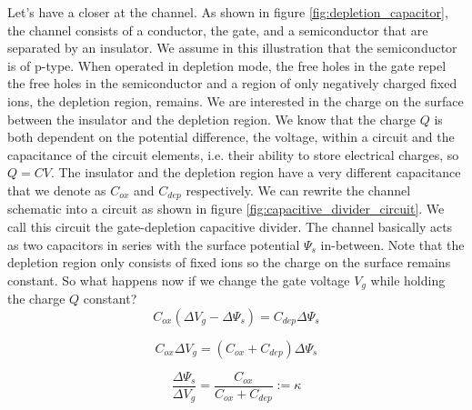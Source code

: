 Let's have a closer at the channel. As shown in figure \ref{fig:depletion_capacitor}, the channel consists of a conductor, the gate, and a semiconductor that are separated by an insulator. We assume in this illustration that the semiconductor is of p-type. When operated in depletion mode, the free holes in the gate repel the free holes in the semiconductor and a region of only negatively charged fixed ions, the depletion region, remains. We are interested in the charge on the surface between the insulator and the depletion region. We know that the charge $Q$ is both dependent on the potential difference, the voltage, within a circuit and the capacitance of the circuit elements, i.e. their ability to store electrical charges, so $Q = CV$. The insulator and the depletion region have a very different capacitance that we denote as $C_{ox}$ and $C_{dep}$ respectively. We can rewrite the channel schematic into a circuit as shown in figure \ref{fig:capacitive_divider_circuit}. We call this circuit the gate-depletion capacitive divider. The channel basically acts as two capacitors in series with the surface potential $\Psi_s$ in-between. Note that the depletion region only consists of fixed ions so the charge on the surface remains constant. So what happens now if we change the gate voltage $V_g$ while holding the charge $Q$ constant?\\

\begin{equation}
   C_{ox}(\Delta V_g - \Delta \Psi_s) = C_{dep} \Delta \Psi_s
\end{equation}

\begin{equation}
C_{ox} \Delta V_g = (C_{ox} + C_{dep}) \Delta \Psi_s
\end{equation}

\begin{equation}
\frac{\Delta \Psi_s}{\Delta V_g} = \frac{C_{ox}}{C_{ox} + C_{dep}} := \kappa
\end{equation}\\

